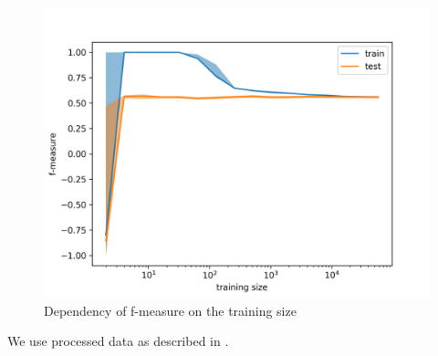 \begin{figure}[h]\centering
\includegraphics[width=130mm]{figures/l_curves_f_measure.png}
\caption{Dependency of f-measure on the training size}
\label{fig:l_curves_f_measure}
\end{figure}


We use processed data as described in .
